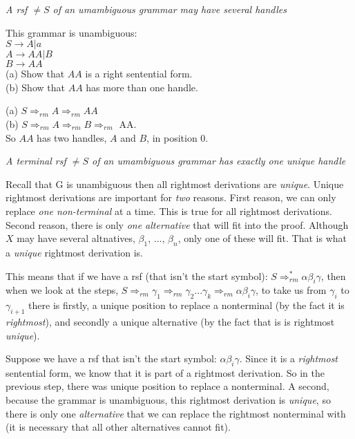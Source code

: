 \frmrule 

\textit{A rsf $\neq S$ of an umambiguous grammar may have several handles}

\begin{example}
This grammar is unambiguous:\\
$S \rightarrow A | a$ \\
$A \rightarrow AA | B$ \\
$B \rightarrow AA$ \\
(a) Show that $AA$ is a right sentential form. \\
(b) Show that $AA$ has more than one handle.

(a) $S \Rightarrow_{rm} A \Rightarrow_{rm} AA$\\
(b) $S \Rightarrow_{rm} A \Rightarrow_{rm} B \Rightarrow_{rm}$ AA. \\
So $AA$ has two handles, $A$ and $B$, in position 0. 
\end{example}


\frmrule 

\textit{A terminal rsf $\neq S$ of an umambiguous grammar has exactly one unique handle}

Recall that G is unambiguous then all rightmost derivations are \textit{unique}. 
Unique rightmost derivations are important for \textit{two} reasons. 
First reason, we can only replace \textit{one non-terminal} at a time. 
This is true for all rightmost derivations. Second reason, 
there is only \textit{one alternative} that will fit into the proof. 
Although $X$ may have several altnatives, $\beta_1$, ..., $\beta_n$, 
only one of these will fit. That is what a \textit{unique} rightmost derivation is.

This means that if we have a rsf (that isn't the start symbol): 
$S \Rightarrow^{*}_{rm} \alpha \beta_i \gamma$, 
then when we look at the steps, $S \Rightarrow_{rm} \gamma_1 \Rightarrow_{rm} \gamma_2 ... \gamma_k \Rightarrow_{rm} \alpha \beta_i \gamma$, 
to take us from $\gamma_i$ to $\gamma_{i+1}$ there is firstly, a unique position to replace a 
nonterminal (by the fact it is \textit{rightmost}), 
and secondly a unique alternative (by the fact that is is rightmost \textit{unique}). 

Suppose we have a rsf that isn't the start symbol: $\alpha \beta_i \gamma$.
Since it is a \textit{rightmost} sentential form, we know that it is part 
of a rightmost derivation. So in the previous step, there was unique position to replace a 
nonterminal. A second, because the grammar is unambiguous, this 
rightmost derivation is \textit{unique}, so there is only one 
\textit{alternative} that we can replace the rightmost nonterminal with 
(it is necessary that all other alternatives cannot fit). 

